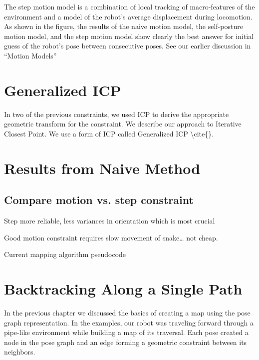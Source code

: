 The step motion model is a combination of local tracking of macro-features of the environment and a model of the robot's average displacement during locomotion. As shown in the figure, the results of the naive motion model, the self-posture motion model, and the step motion model show clearly the best answer for initial guess of the robot's pose between consecutive poses. See our earlier discussion in “Motion Models”

\section{Generalized ICP}
\label{generalizedicp}

In two of the previous constraints, we used ICP to derive the appropriate geometric transform for the constraint. We describe our approach to Iterative Closest Point. We use a form of ICP called Generalized ICP \textbackslash{}cite\{\}.




\section{Results from Naive Method}
\label{resultsfromnaivemethod}

\subsection{Compare motion vs. step constraint}
\label{comparemotionvs.stepconstraint}

Step more reliable, less variances in orientation which is most crucial

Good motion constraint requires slow movement of snake… not cheap.

Current mapping algorithm pseudocode

\section{Backtracking Along a Single Path}
\label{backtrackingalongasinglepath}

In the previous chapter we discussed the basics of creating a map using the pose graph representation. In the examples, our robot was traveling forward through a pipe-like environment while building a map of its traversal. Each pose created a node in the pose graph and an edge forming a geometric constraint between its neighbors.

